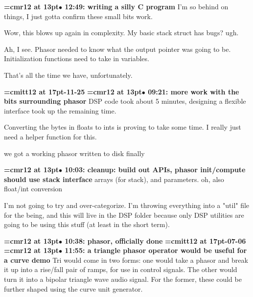 {\smallskip\noindent\bf\font\titlefont=cmr12 at 13pt\titlefont $\bullet$ 12:49: writing a silly C program}\smallskip
I'm so behind on things, I just gotta confirm these small bits work.
\par

Wow, this blows up again in complexity. My basic stack struct has bugs? ugh.
\par

Ah, I see. Phasor needed to know what the output pointer was going to be. Initialization functions need to take in variables.
\par

That's all the time we have, unfortunately. 
\par

{\medskip\noindent\bf\font\titlefont=cmitt12 at 17pt-11-25}\medskip
{\smallskip\noindent\bf\font\titlefont=cmr12 at 13pt\titlefont $\bullet$ 09:21: more work with the bits surrounding phasor}\smallskip
DSP code took about 5 minutes, designing a flexible interface took up the remaining time.
\par

Converting the bytes in floats to ints is proving to take some time. I really just need a helper function for this.
\par

we got a working phasor written to disk finally
\par

{\smallskip\noindent\bf\font\titlefont=cmr12 at 13pt\titlefont $\bullet$ 10:03: cleanup: build out APIs, phasor init/compute should use stack interface}\smallskip
arrays (for stack), and parameters. oh, also float/int conversion
\par

I'm not going to try and over-categorize. I'm throwing everything into a "util" file for the being, and this will live in the DSP folder because only DSP utilities are going to be using this stuff (at least in the short term).
\par

{\smallskip\noindent\bf\font\titlefont=cmr12 at 13pt\titlefont $\bullet$ 10:38: phasor, officially done}\smallskip
{\medskip\noindent\bf\font\titlefont=cmitt12 at 17pt-07-06}\medskip
{\smallskip\noindent\bf\font\titlefont=cmr12 at 13pt\titlefont $\bullet$ 11:55: a triangle phasor operator would be useful for a curve demo}\smallskip
Tri would come in two forms: one would take a phasor and break it up into a rise/fall pair of ramps, for use in control signals. The other would turn it into a bipolar triangle wave audio signal. For the former, these could be further shaped using the curve unit generator.
\par

